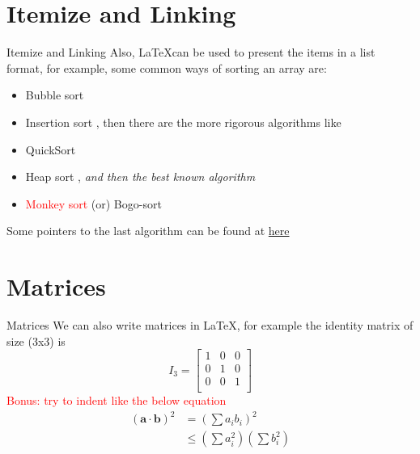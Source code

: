 \documentclass{beamer}
\begin{document}
\section{Itemize and Linking}
\begin{frame}{Itemize and Linking}
    Also, \LaTeX can be used to present the items in a list format, for example, some common ways of sorting an array are:
    \begin{itemize}
        \item Bubble sort
        \item Insertion sort \pause , then there are the more rigorous algorithms like
        \item QuickSort
        \item Heap sort \pause , \textit{and then the best known algorithm}
        \item \textcolor{red}{Monkey sort} (or) Bogo-sort
    \end{itemize}
    Some pointers to the last algorithm can be found at \href{https://en.wikipedia.org/wiki/Bogosort}{here}
\end{frame}

\section{Matrices}
\begin{frame}{Matrices}
    We can also write matrices in \LaTeX, for example the identity matrix of size (3x3) is
    \begin{equation*}
        I_3 = 
        \begin{bmatrix} 
            1 & 0 & 0 \\
            0 & 1 & 0 \\
            0 & 0 & 1 \\
        \end{bmatrix}
    \end{equation*}
    \pause
    \textcolor{red}{Bonus: try to indent like the below equation}
    \begin{equation*}
        \begin{split}
            (\mathbf{a}\cdot\mathbf{b})^2 &= (\sum a_ib_i)^2 \\ &\leq (\sum a_i^2)(\sum b_i^2) 
        \end{split}
    \end{equation*}
\end{frame}
\end{document}
